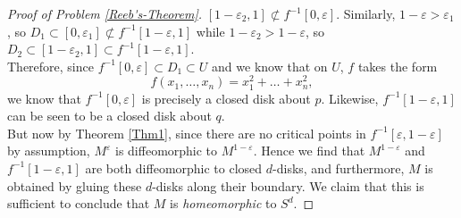 \documentclass[reqno]{amsart}
\theoremstyle{definition}
\theoremstyle{remark}
\begin{document}
\begin{proof}[Proof of Problem \ref{Reeb's-Theorem}]
         $\left[ 1-\varepsilon_2,1 \right] \not \subset 
         f^{-1}\left[ 0,\varepsilon \right] $.
         Similarly,
         $1- \varepsilon > \varepsilon_1$, so
         $D_1 \subset \left[ 0,\varepsilon_1 \right] 
         \not \subset f^{-1}\left[ 1-\varepsilon,1 \right] $
         while $1-\varepsilon_2 > 1- \varepsilon$, so
         $D_2 \subset \left[ 1-\varepsilon_2, 1 \right] 
         \subset f^{-1}\left[ 1-\varepsilon,1 \right] $.\\
         \linebreak
         Therefore,
         since $f^{-1}\left[ 0,\varepsilon \right] \subset D_1
         \subset U$ and
         we know that on
         $U$, $f$ takes the form
         \[
         f\left( x_1,\ldots,x_n \right) 
         = x_1^2 + \ldots + x_n^2,
         \] 
         we know that
         $f^{-1}\left[ 0,\varepsilon \right] $ is
         precisely a closed disk about
         $p$. Likewise,
         $f^{-1}\left[ 1-\varepsilon,1 \right] $ can
         be seen to be a closed disk about $q$.\\

         But now by Theorem \ref{Thm1}, since
         there are no critical points in
         $f^{-1}\left[ \varepsilon, 1- \varepsilon \right] $ 
         by assumption,
         $M^{\varepsilon}$ is diffeomorphic to
         $M^{1- \varepsilon}$.
         Hence we find that
         $M^{1-\varepsilon}$ and
         $f^{-1}\left[ 1-\varepsilon,1 \right] $ 
         are both diffeomorphic to closed $d$-disks, and
         furthermore,
         $M$ is obtained by gluing these  $d$-disks along their
         boundary. We claim that this is sufficient
         to conclude that $M$ is \textit{homeomorphic} to
         $S^{d}$.


    \end{proof}




\end{document}
